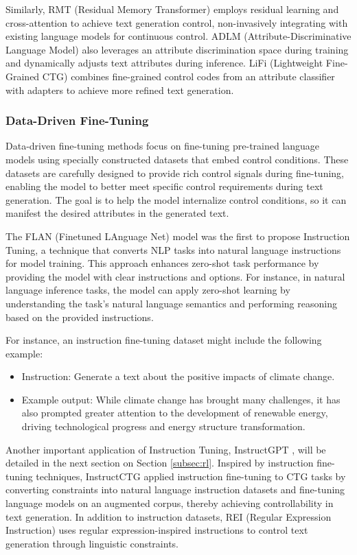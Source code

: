 \documentclass[acmsmall, screen]{acmart}
\begin{document}
Similarly, RMT (Residual Memory Transformer) \cite{zhang_acl24_RMT} employs residual learning and cross-attention to achieve text generation control, non-invasively integrating with existing language models for continuous control. ADLM (Attribute-Discriminative Language Model) \cite{kwak_acl23_ADML} also leverages an attribute discrimination space during training and dynamically adjusts text attributes during inference. LiFi (Lightweight Fine-Grained CTG) \cite{shi_arxiv24_LiFi} combines fine-grained control codes from an attribute classifier with adapters to achieve more refined text generation.

\subsubsection{\textbf{Data-Driven Fine-Tuning}} 
Data-driven fine-tuning methods focus on fine-tuning pre-trained language models using specially constructed datasets that embed control conditions. These datasets are carefully designed to provide rich control signals during fine-tuning, enabling the model to better meet specific control requirements during text generation. The goal is to help the model internalize control conditions, so it can manifest the desired attributes in the generated text.

The FLAN (Finetuned LAnguage Net) model \cite{wei_iclr22_FLAN} was the first to propose Instruction Tuning, a technique that converts NLP tasks into natural language instructions for model training. This approach enhances zero-shot task performance by providing the model with clear instructions and options. For instance, in natural language inference tasks, the model can apply zero-shot learning by understanding the task's natural language semantics and performing reasoning based on the provided instructions.

For instance, an instruction fine-tuning dataset might include the following example:
\begin{itemize}
  \item Instruction: Generate a text about the positive impacts of climate change.
  \item Example output: While climate change has brought many challenges, it has also prompted greater attention to the development of renewable energy, driving technological progress and energy structure transformation.
\end{itemize}

Another important application of Instruction Tuning, InstructGPT \cite{ouyang_neurips22_InstructGPT}, will be detailed in the next section on Section \ref{subsec:rl}. 
Inspired by instruction fine-tuning techniques, InstructCTG \cite{zhou_icml23_InstructCTG} applied instruction fine-tuning to CTG tasks by converting constraints into natural language instruction datasets and fine-tuning language models on an augmented corpus, thereby achieving controllability in text generation.
In addition to instruction datasets, REI (Regular Expression Instruction) \cite{zheng_aacl23_REI} uses regular expression-inspired instructions to control text generation through linguistic constraints.
\end{document}
